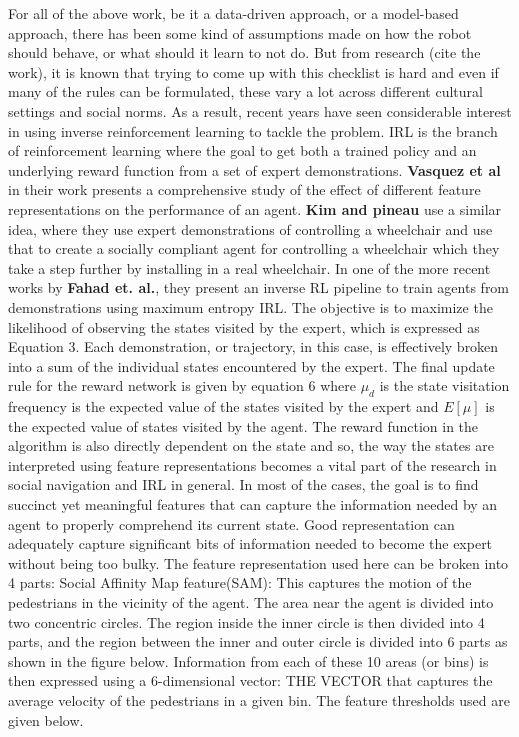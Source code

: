 For all of the above work, be it a data-driven approach, or a model-based approach, there has been some kind of assumptions made on how the robot should behave, or what should it learn to not do. But from research (cite the work), it is known that trying to come up with this checklist is hard and even if many of the rules can be formulated, these vary a lot across different cultural settings and social norms. As a result, recent years have seen considerable interest in using inverse reinforcement learning to tackle the problem. IRL is the branch of reinforcement learning where the goal to get both a trained policy and an underlying reward function from a set of expert demonstrations.
\textbf{Vasquez et al} in their work presents a comprehensive study of the effect of different feature representations on the performance of an agent.
\textbf{Kim and pineau} use a similar idea, where they use expert demonstrations of controlling a wheelchair and use that to create a socially compliant agent for controlling a wheelchair which they take a step further by installing in a real wheelchair. 
In one of the more recent works by \textbf{Fahad et. al.}, they present an inverse RL pipeline to train agents from demonstrations using maximum entropy IRL.
The objective is to maximize the likelihood of observing the states visited by the expert, which is expressed as Equation 3.
Each demonstration, or trajectory, in this case, is effectively broken into a sum of the individual states encountered by the expert. The final update rule for the reward network is given by equation 6 
where $\mu_{d}$ is the state visitation frequency is the expected value of the states visited by the expert and $E[\mu]$ is the expected value of states visited by the agent. The reward function in the algorithm is also directly dependent on the state and so, the way the states are interpreted using feature representations becomes a vital part of the research in social navigation and IRL in general. 
In most of the cases, the goal is to find succinct yet meaningful features that can capture the information needed by an agent to properly comprehend its current state. Good representation can adequately capture significant bits of information needed to become the expert without being too bulky.  The feature representation used here can be broken into 4 parts:
Social Affinity Map feature(SAM): This captures the motion of the pedestrians in the vicinity of the agent. The area near the agent is divided into two concentric circles. The region inside the inner circle is then divided into 4 parts, and the region between the inner and outer circle is divided into 6 parts as shown in the figure below.
Information from each of these 10 areas (or bins) is then expressed using a 6-dimensional vector:
THE VECTOR	
that captures the average velocity of the pedestrians in a given bin. The feature thresholds used are given below.

